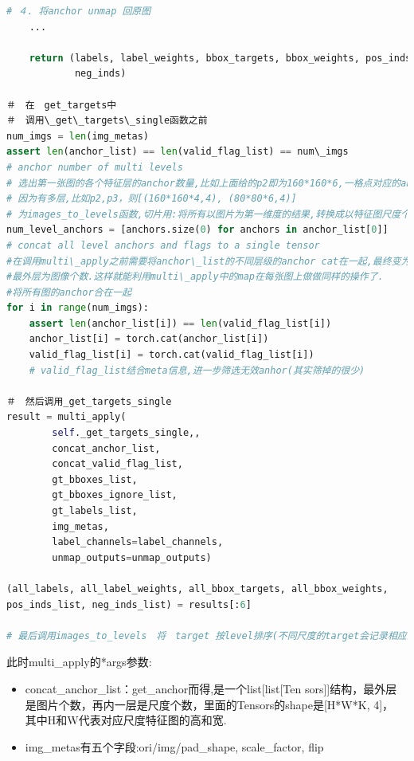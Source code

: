 \documentclass[UTF8]{ctexart}
\begin{document}
\begin{lstlisting}[language=Python]
    # ４. 将anchor unmap 回原图
    ...

    return (labels, label_weights, bbox_targets, bbox_weights, pos_inds,
            neg_inds)
            
＃　在　get_targets中
＃　调用\_get\_targets\_single函数之前
num_imgs = len(img_metas)
assert len(anchor_list) == len(valid_flag_list) == num\_imgs
# anchor number of multi levels
# 选出第一张图的各个特征层的anchor数量,比如上面给的p2即为160*160*6,一格点对应的anhor shape为(6,4)
# 因为有多层,比如p2,p3，则[(160*160*4,4), (80*80*6,4)]
# 为images_to_levels函数,切片用:将所有以图片为第一维度的结果,转换成以特征图尺度个数为第一维度的结果(算loss)
num_level_anchors = [anchors.size(0) for anchors in anchor_list[0]]
# concat all level anchors and flags to a single tensor
#在调用multi\_apply之前需要将anchor\_list的不同层级的anchor cat在一起,最终变为list[Tensor]结构.
#最外层为图像个数.这样就能利用multi\_apply中的map在每张图上做做同样的操作了.
#将所有图的anchor合在一起
for i in range(num_imgs):
	assert len(anchor_list[i]) == len(valid_flag_list[i])
	anchor_list[i] = torch.cat(anchor_list[i])
	valid_flag_list[i] = torch.cat(valid_flag_list[i])
    # valid_flag_list结合meta信息,进一步筛选无效anhor(其实筛掉的很少)

＃　然后调用_get_targets_single
result = multi_apply(
        self._get_targets_single,,
        concat_anchor_list,
        concat_valid_flag_list,
        gt_bboxes_list,
        gt_bboxes_ignore_list,
        gt_labels_list,
        img_metas,
        label_channels=label_channels,
        unmap_outputs=unmap_outputs)

(all_labels, all_label_weights, all_bbox_targets, all_bbox_weights,
pos_inds_list, neg_inds_list) = results[:6]

# 最后调用images_to_levels　将　target 按level排序(不同尺度的target会记录相应的anchor个数,作为level分界线)
\end{lstlisting}

此时multi\_apply的*args参数:
\begin{itemize}
    \item concat\_anchor\_list：get\_anchor而得,是一个list[list[Ten
    sors]]结构，最外层是图片个数，再内一层是尺度个数，里面的Tensors的shape是[H*W*K, 4]，
    其中H和W代表对应尺度特征图的高和宽.
	\item img\_metas有五个字段:ori/img/pad\_shape, scale\_factor, flip
	
\end{itemize}
\end{document}
